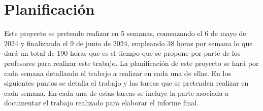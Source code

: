 


\section{Planificación}
Este proyecto se pretende realizar en 5 semanas, comenzando el 6 de mayo de 2024 y finalizando el 9 de junio de 2024, empleando 38 horas por semana lo que dará un total de 190 horas que es el tiempo que se propone por parte de los profesores para realizar este trabajo. La planificación de este proyecto se hará por cada semana detallando el trabajo a realizar en cada una de ellas. En los siguientes puntos se detalla el trabajo y las tareas que se pretenden realizar en cada semana. En cada una de estas tareas se incluye la parte asociada a documentar el trabajo realizado para elaborar el informe final.


